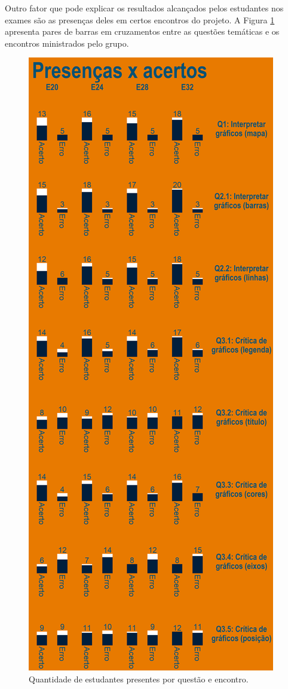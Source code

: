 \documentclass[
]{book}
\begin{document}
Outro fator que pode explicar os resultados alcançados pelos estudantes nos exames são as presenças deles em certos encontros do projeto. A Figura \ref{fig:impacto32} apresenta pares de barras em cruzamentos entre as questões temáticas e os encontros ministrados pelo grupo.

\begin{figure}

{\centering \includegraphics[width=0.75\linewidth,height=0.75\textheight]{images/Impactos/32} 

}

\caption{Quantidade de estudantes presentes por questão e encontro.}\label{fig:impacto32}
\end{figure}
\end{document}

